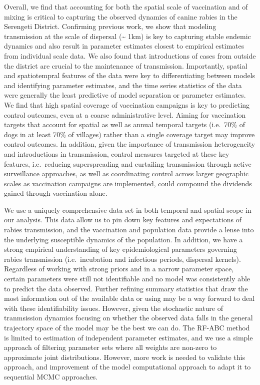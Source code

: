 \documentclass[
]{book}
\begin{document}
Overall, we find that accounting for both the spatial scale of vaccination and of mixing is critical to capturing the observed dynamics of canine rabies in the Serengeti District. Confirming previous work, we show that modeling transmission at the scale of dispersal (\textasciitilde{} 1km) is key to capturing stable endemic dynamics and also result in parameter estimates closest to empirical estimates from individual scale data. We also found that introductions of cases from outside the district are crucial to the maintenance of transmission. Importantly, spatial and spatiotempral features of the data were key to differentiating between models and identifying parameter estimates, and the time series statistics of the data were generally the least predictive of model separation or parameter estimates. We find that high spatial coverage of vaccination campaigns is key to predicting control outcomes, even at a coarse administrative level. Aiming for vaccination targets that account for spatial as well as annual temporal targets (i.e.~70\% of dogs in at least 70\% of villages) rather than a single coverage target may improve control outcomes. In addition, given the importance of transmission heterogeneity and introductions in transmission, control measures targeted at these key features, i.e.~reducing superspreading and curtailing transmission through active surveillance approaches, as well as coordinating control across larger geographic scales as vaccination campaigns are implemented, could compound the dividends gained through vaccination alone.

We use a uniquely comprehensive data set in both temporal and spatial scope in our analysis. This data allow us to pin down key features and expectations of rabies transmission, and the vaccination and population data provide a lense into the underlying susceptible dynamics of the population. In addition, we have a strong empirical understanding of key epidemiological parameters governing rabies transmission (i.e.~incubation and infectious periods, dispersal kernels). Regardless of working with strong priors and in a narrow parameter space, certain parameters were still not identifiable and no model was consistently able to predict the data observed. Further refining summary statistics that draw the most information out of the available data or using may be a way forward to deal with these identifiability issues. However, given the stochastic nature of tranmsission dynamics focusing on whether the observed data falls in the general trajectory space of the model may be the best we can do. The RF-ABC method is limited to estimation of independent parameter estimates, and we use a simple approach of filtering parameter sets where all weights are non-zero to approximate joint distributions. However, more work is needed to validate this approach, and improvement of the model computational approach to adapt it to sequential MCMC approaches.
\end{document}
